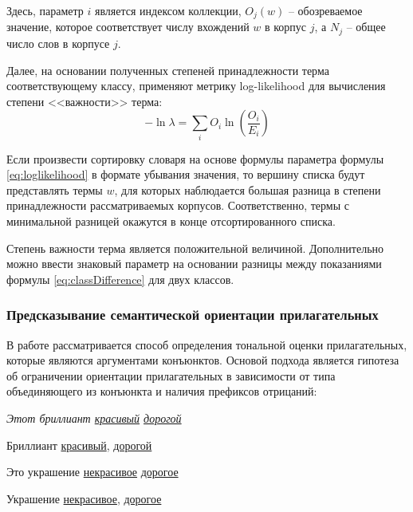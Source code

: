         Здесь, параметр $i$ является индексом коллекции, $O_j(w)$ -- обозреваемое
        значение, которое соответствует числу вхождений $w$ в корпус $j$, а $N_j$
        -- общее число слов в корпусе $j$.

        Далее, на основании полученных степеней принадлежности терма соответствующему
        классу, применяют метрику log-likelihood для вычисления степени <<важности>>
        терма:
        \begin{equation}
            \label{eq:loglikelihood}
            - \ln \lambda = \sum\limits_i O_i \ln \left( \dfrac{O_i}{E_i} \right)
        \end{equation}

        Если произвести сортировку словаря на основе формулы параметра формулы
        \ref{eq:loglikelihood} в формате убывания значения, то вершину списка
        будут представлять термы $w$, для которых наблюдается большая разница в
        степени принадлежности рассматриваемых корпусов. Соответственно, термы
        с минимальной разницей окажутся в конце отсортированного списка.

        Степень важности терма является положительной величиной. Дополнительно можно
        ввести знаковый параметр на основании разницы между показаниями формулы
        \ref{eq:classDifference} для двух классов.

        \subsubsection{Предсказывание семантической ориентации прилагательных}
        \label{sec:adjectivesPrediction}
        В работе \cite{lexiconAdjectives} рассматривается способ определения
        тональной оценки прилагательных, которые являются аргументами конъюнктов.
        Основой подхода является гипотеза об ограничении ориентации прилагательных
        в зависимости от типа объединяющего из конъюнкта и наличия префиксов отрицаний:
        \begin{center}
            \it
            Этот бриллиант \underline{красивый} {} \underline{дорогой}

            Бриллиант \underline{красивый}, {} \underline{дорогой}

            Это украшение \underline{некрасивое} {} \underline{дорогое}

            Украшение \underline{некрасивое}, {} \underline{дорогое}
        \end{center}

